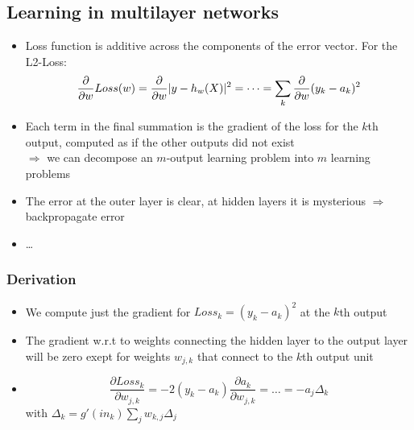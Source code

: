\documentclass{scrartcl}
\DeclarePairedDelimiter\abs{\lvert}{\rvert}%
\begin{document}
\subsection{Learning in multilayer networks}
\begin{itemize}
    \item
        Loss function is additive across the components of the error vector.
        For the L2-Loss: \[\frac{\partial}{\partial w} Loss(w) = \frac{\partial}{\partial w} \abs{y-h_w(X)}^2 = \dots = \sum_k \frac\partial{\partial w} (y_k - a_k)^2\] 
    \item
        Each term in the final summation is the gradient of the loss for the \(k\)th output, computed as if the other outputs did not exist\\
        \(\Rightarrow\) we can decompose an \(m\)-output learning problem into \(m\) learning problems
    \item
        The error at the outer layer is clear, at hidden layers it is mysterious \(\Rightarrow\) backpropagate error 
    \item
        \dots
\end{itemize}
\subsubsection{Derivation}
\begin{itemize}
    \item
        We compute just the gradient for \(Loss_k = (y_k - a_k)^2\) at the \(k\)th output 
    \item
        The gradient w.r.t to weights connecting the hidden layer to the output layer will be zero exept for weights \(w_{j,k}\) that connect to the \(k\)th output unit
    \item
        \[\frac{\partial Loss_k}{\partial w_{j,k}} = -2(y_k -a_k) \frac{\partial a_k}{\partial w_{j,k}} = \dots = -a_j \Delta_k\]
        with \(\Delta_k = g'(in_k) \sum_j w_{k,j} \Delta_j\)
\end{itemize}
\end{document}
